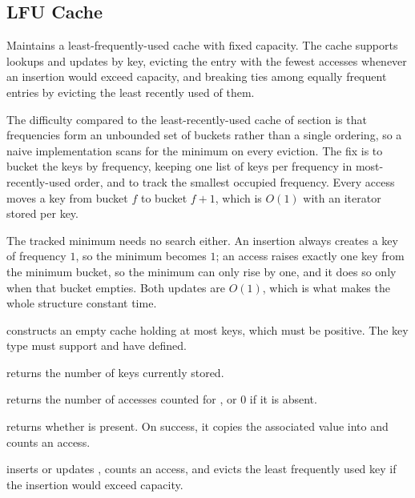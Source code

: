 \subsection{LFU Cache}
\label{sec:2.1.4}
Maintains a least-frequently-used cache with fixed capacity. The cache supports lookups and updates by key, evicting the entry with the fewest accesses whenever an insertion would exceed capacity, and breaking ties among equally frequent entries by evicting the least recently used of them.

The difficulty compared to the least-recently-used cache of section  is that frequencies form an unbounded set of buckets rather than a single ordering, so a naive implementation scans for the minimum on every eviction. The fix is to bucket the keys by frequency, keeping one list of keys per frequency in most-recently-used order, and to track the smallest occupied frequency. Every access moves a key from bucket $f$ to bucket $f + 1$, which is $O(1)$ with an iterator stored per key.

The tracked minimum needs no search either. An insertion always creates a key of frequency $1$, so the minimum becomes $1$; an access raises exactly one key from the minimum bucket, so the minimum can only rise by one, and it does so only when that bucket empties. Both updates are $O(1)$, which is what makes the whole structure constant time.

\begin{compactitem}
  \item {} constructs an empty cache holding at most  keys, which must be positive. The key type  must support  and have  defined.
  \item {} returns the number of keys currently stored.
  \item {} returns the number of accesses counted for , or $0$ if it is absent.
  \item {} returns whether  is present. On success, it copies the associated value into  and counts an access.
  \item {} inserts or updates , counts an access, and evicts the least frequently used key if the insertion would exceed capacity.
\end{compactitem}

